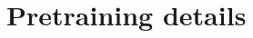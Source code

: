 \documentclass[]{fairmeta}
\begin{document}



\clearpage
\newpage



\clearpage
\newpage
\beginappendix


\section{Pretraining details} \label{app:pretraining}
\end{document}
